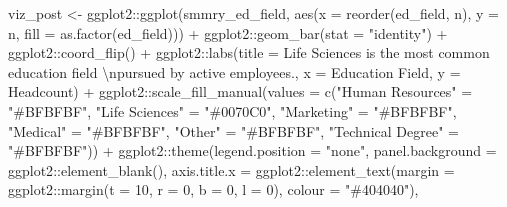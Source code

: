 \documentclass[
]{book}
\newenvironment{Shaded}{\begin{snugshade}}{\end{snugshade}}
\newcommand{\AttributeTok}[1]{\textcolor[rgb]{0.77,0.63,0.00}{#1}}
\newcommand{\DecValTok}[1]{\textcolor[rgb]{0.00,0.00,0.81}{#1}}
\newcommand{\FunctionTok}[1]{\textcolor[rgb]{0.00,0.00,0.00}{#1}}
\newcommand{\NormalTok}[1]{#1}
\newcommand{\OtherTok}[1]{\textcolor[rgb]{0.56,0.35,0.01}{#1}}
\newcommand{\SpecialCharTok}[1]{\textcolor[rgb]{0.00,0.00,0.00}{#1}}
\newcommand{\StringTok}[1]{\textcolor[rgb]{0.31,0.60,0.02}{#1}}
\begin{document}
\begin{Shaded}
\begin{Highlighting}[]
\NormalTok{viz\_post }\OtherTok{\textless{}{-}}\NormalTok{ ggplot2}\SpecialCharTok{::}\FunctionTok{ggplot}\NormalTok{(smmry\_ed\_field, }\FunctionTok{aes}\NormalTok{(}\AttributeTok{x =} \FunctionTok{reorder}\NormalTok{(ed\_field, n), }\AttributeTok{y =}\NormalTok{ n, }\AttributeTok{fill =} \FunctionTok{as.factor}\NormalTok{(ed\_field))) }\SpecialCharTok{+}
\NormalTok{            ggplot2}\SpecialCharTok{::}\FunctionTok{geom\_bar}\NormalTok{(}\AttributeTok{stat =} \StringTok{"identity"}\NormalTok{) }\SpecialCharTok{+}
\NormalTok{            ggplot2}\SpecialCharTok{::}\FunctionTok{coord\_flip}\NormalTok{() }\SpecialCharTok{+}
\NormalTok{            ggplot2}\SpecialCharTok{::}\FunctionTok{labs}\NormalTok{(}\AttributeTok{title =} \StringTok{\textquotesingle{}Life Sciences is the most common education field }\SpecialCharTok{\textbackslash{}n}\StringTok{pursued by active employees.\textquotesingle{}}\NormalTok{, }\AttributeTok{x =} \StringTok{\textquotesingle{}Education Field\textquotesingle{}}\NormalTok{, }\AttributeTok{y =} \StringTok{\textquotesingle{}Headcount\textquotesingle{}}\NormalTok{) }\SpecialCharTok{+}
\NormalTok{            ggplot2}\SpecialCharTok{::}\FunctionTok{scale\_fill\_manual}\NormalTok{(}\AttributeTok{values =} \FunctionTok{c}\NormalTok{(}\StringTok{"Human Resources"} \OtherTok{=} \StringTok{"\#BFBFBF"}\NormalTok{, }
                                                  \StringTok{"Life Sciences"} \OtherTok{=} \StringTok{"\#0070C0"}\NormalTok{, }
                                                  \StringTok{"Marketing"} \OtherTok{=} \StringTok{"\#BFBFBF"}\NormalTok{, }
                                                  \StringTok{"Medical"} \OtherTok{=} \StringTok{"\#BFBFBF"}\NormalTok{,}
                                                  \StringTok{"Other"} \OtherTok{=} \StringTok{"\#BFBFBF"}\NormalTok{,}
                                                  \StringTok{"Technical Degree"} \OtherTok{=} \StringTok{"\#BFBFBF"}\NormalTok{)) }\SpecialCharTok{+}
\NormalTok{              ggplot2}\SpecialCharTok{::}\FunctionTok{theme}\NormalTok{(}\AttributeTok{legend.position =} \StringTok{"none"}\NormalTok{,}
                             \AttributeTok{panel.background =}\NormalTok{ ggplot2}\SpecialCharTok{::}\FunctionTok{element\_blank}\NormalTok{(),}
                             \AttributeTok{axis.title.x =}\NormalTok{ ggplot2}\SpecialCharTok{::}\FunctionTok{element\_text}\NormalTok{(}\AttributeTok{margin =}\NormalTok{ ggplot2}\SpecialCharTok{::}\FunctionTok{margin}\NormalTok{(}\AttributeTok{t =} \DecValTok{10}\NormalTok{, }\AttributeTok{r =} \DecValTok{0}\NormalTok{, }\AttributeTok{b =} \DecValTok{0}\NormalTok{, }\AttributeTok{l =} \DecValTok{0}\NormalTok{), }\AttributeTok{colour =} \StringTok{"\#404040"}\NormalTok{),}

\end{Highlighting}
\end{Shaded}
\end{document}
